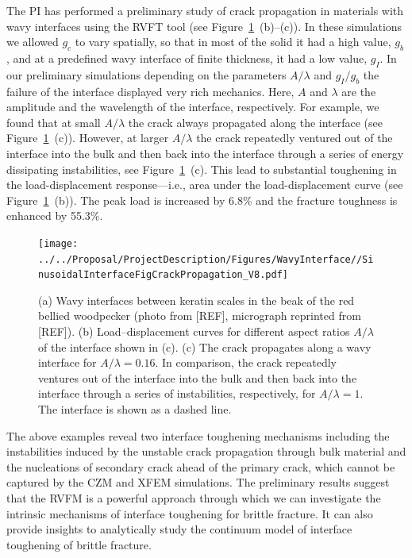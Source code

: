 \documentclass[10pt,letterpaper]{article}
\begin{document}
The PI has performed a preliminary study of crack propagation in materials with wavy interfaces using the RVFT tool (see Figure~\ref{fig:VRF-WI}~(b)--(c)). 
%
In these simulations we allowed $g_c$ to vary spatially, so that in most of the solid it had a high value, $g_{b}$, and at a predefined wavy interface of finite thickness, it had a low value, $g_{I}$. 
%
In our preliminary simulations depending on the parameters $A/\lambda$ and $g_{I}/g_{b}$ the failure of the interface displayed very rich mechanics. 
%
Here, $A$ and $\lambda$ are the amplitude and the wavelength of the interface, respectively. 
%
For example, we found that at small $A/\lambda$ the crack always propagated along the interface (see Figure~\ref{fig:VRF-WI}~(c)). 
%
However, at larger $A/\lambda$ the crack repeatedly ventured out of the interface into the bulk and then back into the interface through a series of energy dissipating instabilities, see Figure~\ref{fig:VRF-WI}~(c). 
%
This lead to substantial toughening in the load-displacement response---i.e., area under the load-displacement curve (see Figure~\ref{fig:VRF-WI}~(b)).
%
The peak load is increased by 6.8\% and the fracture toughness is enhanced by 55.3\%. 
%
%
\begin{figure}[h]
	\texttt{[image: ../../Proposal/ProjectDescription/Figures/WavyInterface//SinusoidalInterfaceFigCrackPropagation\_V8.pdf]}
	\centering	
	\caption{ (a) Wavy interfaces between keratin scales in the beak of the red bellied woodpecker (photo from [REF], micrograph reprinted from [REF]). (b) Load--displacement curves for different aspect ratios $A/\lambda$ of the interface shown in (c). (c) The crack propagates along a wavy interface for $A/\lambda = 0.16$. In comparison, the crack repeatedly ventures out of the interface into the bulk and then back into the interface through a series of instabilities, respectively, for $A/\lambda = 1$. The interface is shown as a dashed line.
	}
	\label{fig:VRF-WI} 
\end{figure}



The above examples reveal two interface toughening mechanisms including the instabilities induced by the unstable crack propagation through bulk material and the nucleations of secondary crack ahead of the primary crack, which cannot be captured by the CZM and XFEM simulations. The preliminary results suggest that the RVFM is a powerful approach through which we can investigate the intrinsic mechanisms of interface toughening for brittle fracture. It can also provide insights to analytically study the continuum model of interface toughening of brittle fracture.
% 
% 
\end{document}
